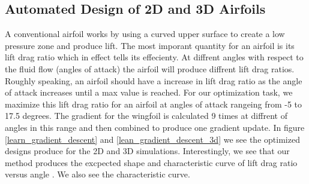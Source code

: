 \documentclass{article} %
\begin{document}
\subsection{Automated Design of 2D and 3D Airfoils}

A conventional airfoil works by using a curved upper surface to create a low pressure zone and produce lift. The most imporant quantity for an airfoil is its lift drag ratio which in effect tells its effecienty. At diffrent angles with respect to the fluid flow (angles of attack) the airfoil will produce diffrent lift drag ratios. Roughly speaking, an airfoil should have a increase in lift drag ratio as the angle of attack increases until a max value is reached. For our optimization task, we maximize this lift drag ratio for an airfoil at angles of attack rangeing from -5 to 17.5 degrees. The gradient for the wingfoil is calculated 9 times at diffrent of angles in this range and then combined to produce one gradient update. In figure \ref{learn_gradient_descent} and \ref{lean_gradient_descent_3d} we see the optimized designs produce for the 2D and 3D simulations. Interestingly, we see that our method produces the excpected shape and characteristic curve of lift drag ratio versus angle . We also see the characteristic curve.
\end{document}
